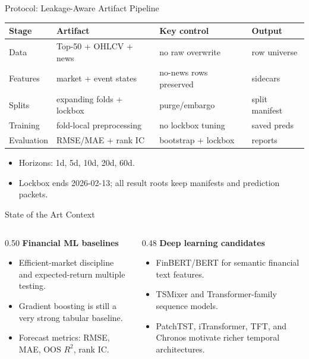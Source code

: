 \documentclass[aspectratio=169]{beamer}
\begin{document}
\begin{frame}{Protocol: Leakage-Aware Artifact Pipeline}
\begin{center}
\small
\begin{tabular}{@{}llll@{}}
\toprule
Stage & Artifact & Key control & Output \\
\midrule
Data & Top-50 + OHLCV + news & no raw overwrite & row universe \\
Features & market + event states & no-news rows preserved & sidecars \\
Splits & expanding folds + lockbox & purge/embargo & split manifest \\
Training & fold-local preprocessing & no lockbox tuning & saved preds \\
Evaluation & RMSE/MAE + rank IC & bootstrap + lockbox & reports \\
\bottomrule
\end{tabular}
\end{center}
\vspace{0.5em}
\begin{itemize}
  \item Horizons: 1d, 5d, 10d, 20d, 60d.
  \item Lockbox ends 2026-02-13; all result roots keep manifests and prediction packets.
\end{itemize}
\end{frame}

\begin{frame}{State of the Art Context}
\begin{columns}[T]
\begin{column}{0.50\textwidth}
\textbf{Financial ML baselines}
\begin{itemize}
  \item Efficient-market discipline and expected-return multiple testing.
  \item Gradient boosting is still a very strong tabular baseline.
  \item Forecast metrics: RMSE, MAE, OOS $R^2$, rank IC.
\end{itemize}
\end{column}
\begin{column}{0.48\textwidth}
\textbf{Deep learning candidates}
\begin{itemize}
  \item FinBERT/BERT for semantic financial text features.
  \item TSMixer and Transformer-family sequence models.
  \item PatchTST, iTransformer, TFT, and Chronos motivate richer temporal architectures.
\end{itemize}
\end{column}
\end{columns}
\end{frame}
\end{document}
